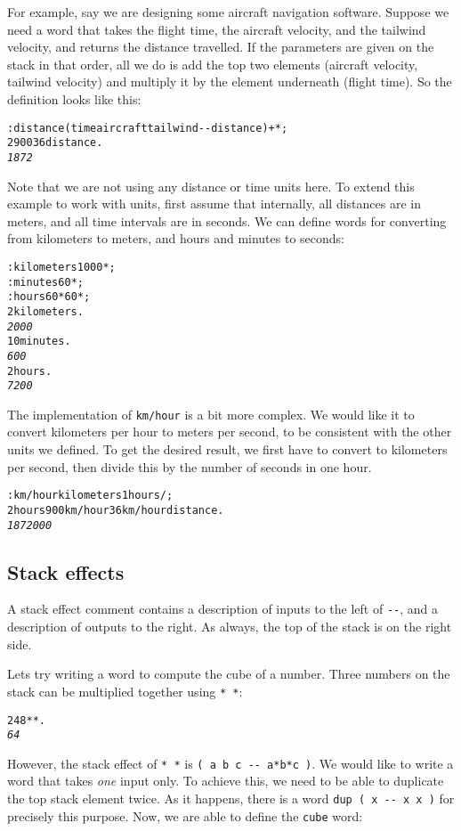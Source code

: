 \documentclass[english]{article}
\begin{document}
For example, say we are designing some aircraft
navigation software. Suppose we need a word that takes the flight time, the aircraft
velocity, and the tailwind velocity, and returns the distance travelled.
If the parameters are given on the stack in that order, all we do
is add the top two elements (aircraft velocity, tailwind velocity)
and multiply it by the element underneath (flight time). So the definition
looks like this:

\begin{alltt}
: distance ( time aircraft tailwind -{}- distance ) + {*} ;
2 900 36 distance .
\emph{1872}
\end{alltt}

Note that we are not using any distance or time units here. To extend this example to work with units, first assume that internally, all distances are
in meters, and all time intervals are in seconds. We can define words
for converting from kilometers to meters, and hours and minutes to
seconds:

\begin{alltt}
: kilometers 1000 {*} ;
: minutes 60 {*} ;
: hours 60 {*} 60 {*} ;
2 kilometers .
\emph{2000}
10 minutes .
\emph{600}
2 hours .
\emph{7200}
\end{alltt}

The implementation of \texttt{km/hour} is a bit more complex. We would like it to convert kilometers per hour to meters per second, to be consistent with the other units we defined. To get the desired result, we first have to convert to kilometers per second, then divide this by the number of seconds in one hour.

\begin{alltt}
: km/hour kilometers 1 hours / ;
2 hours 900 km/hour 36 km/hour distance .
\emph{1872000}
\end{alltt}

\subsection{Stack effects}

A stack effect comment contains a description of inputs to the left
of \texttt{-{}-}, and a description of outputs to the right. As always,
the top of the stack is on the right side.

Lets try writing a word to compute the cube of a number. 
Three numbers on the stack can be multiplied together using \texttt{{*}
{*}}:

\begin{alltt}
2 4 8 {*} {*} .
\emph{64}
\end{alltt}
However, the stack effect of \texttt{{*} {*}} is \texttt{( a b c -{}-
a{*}b{*}c )}. We would like to write a word that takes \emph{one} input
only. To achieve this, we need to be able to duplicate the top stack
element twice. As it happens, there is a word \texttt{dup ( x -{}-
x x )} for precisely this purpose. Now, we are able to define the
\texttt{cube} word:
\end{document}
